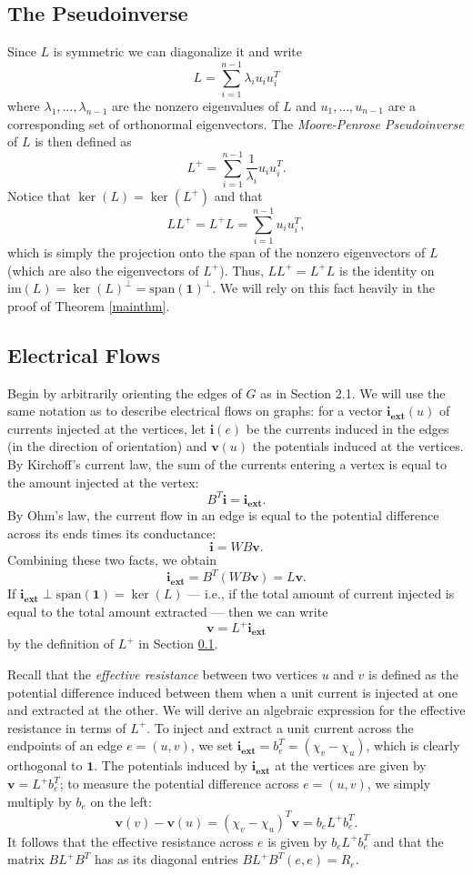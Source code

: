 \documentclass[11pt]{article}
\newcommand{\iex}{\mathbf{i_{\textrm{ext}}}}
\renewcommand{\i}{\mathbf{i}}
\renewcommand{\v}{\mathbf{v}}
\newcommand{\cross}{+}
\newcommand{\im}{\mathrm{im}}
\newcommand{\onevec}{\mathbf{1}}
\begin{document}
\subsection{The Pseudoinverse}\label{secpseudo}
Since $L$ is symmetric we can diagonalize it and write
\[ L=\sum_{i=1}^{n-1}\lambda_i u_iu_i^T\]
where $\lambda_1,\ldots,\lambda_{n-1}$ are the nonzero eigenvalues of $L$ and
$u_1,\ldots,u_{n-1}$ are a corresponding set of orthonormal eigenvectors. The {\em
Moore-Penrose Pseudoinverse} of $L$ is then defined as
\[ L^\cross=\sum_{i=1}^{n-1}\frac{1}{\lambda_i} u_iu_i^T.\]
Notice that $\ker(L)=\ker(L^\cross)$ and that
\[ LL^\cross=L^\cross L=\sum_{i=1}^{n-1}u_iu_i^T,\]
which is simply the projection onto the span of the
nonzero eigenvectors of $L$ (which are also the eigenvectors of $L^\cross$). Thus, $LL^\cross=L^\cross L$ is the identity on
$\im(L)=\ker(L)^\perp=\mathrm{span}(\onevec)^\perp$. We will rely on this fact
heavily in the proof of Theorem \ref{mainthm}.

\subsection{Electrical Flows}
Begin by arbitrarily orienting the edges of $G$ as in Section 2.1. 
We will use the same notation as \cite{guat} to describe electrical flows on graphs:
for a vector $\iex(u)$ of currents injected at the vertices, let $\i(e)$ be the currents induced in
the edges (in the direction of orientation) and $\v(u)$ the potentials induced at the vertices. By Kirchoff's
current law, the sum of the currents entering a vertex is equal to the amount
injected at the vertex:
\[ B^T\i=\iex.\]
By Ohm's law, the current flow in an edge is equal to the potential difference
across its ends times its conductance:
\[\i = WB\v.\]
Combining these two facts, we obtain
\[ \iex=B^T(WB\v)=L\v.\]
If $\iex\perp \mathrm{span}(\mathbf{1})=\ker(L)$ --- i.e., if the total amount of current injected is equal to the total amount extracted --- then we can write
\[\v=L^\cross\iex\]
by the definition of $L^\cross$ in Section \ref{secpseudo}. 

Recall that the {\em effective resistance} between two vertices $u$ and $v$ is defined as
the potential difference induced between them when a unit current is injected at
one and extracted at the other.
We will derive an algebraic expression for the effective resistance in terms of
$L^\cross$.  To inject and extract a unit current across the endpoints of an edge $e=(u,v)$,
we set $\iex=b_e^T=(\chi_v-\chi_u)$, which
is clearly orthogonal to $\mathbf{1}$. The potentials induced by $\iex $
at the vertices are given by $\v=L^\cross b_e^T$; to measure the potential difference across
$e=(u,v)$, we simply multiply by $b_e$ on the left:
\[ \v(v)-\v(u)=(\chi_v-\chi_u)^T\v=b_eL^\cross b_e^T.\]
It follows that the effective resistance across
$e$ is given by $b_eL^\cross b_e^T$ and that the matrix $BL^\cross B^T$
has as its diagonal entries $BL^\cross B^T(e,e)=R_e$.
\end{document}
